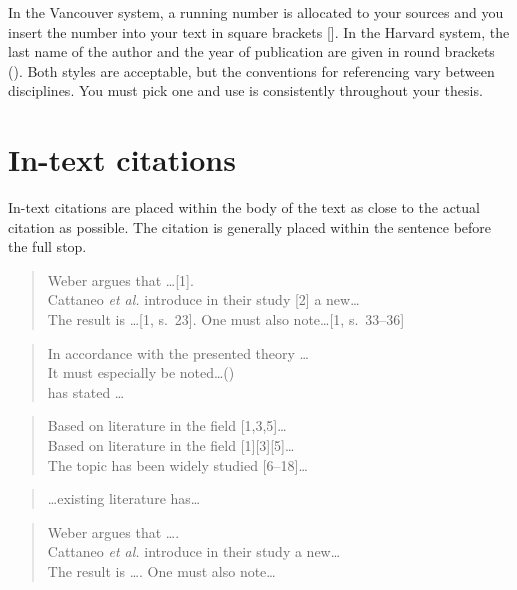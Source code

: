 \documentclass[twoside,draftfooter]{tutthesis} %
\newif\ifnameyear
\begin{document}
In the Vancouver system, a running number is allocated to your sources and you insert the number into your text in square brackets [].
In the Harvard system, the last name of the author and the year of publication are given in round brackets ().
Both styles are acceptable, but the conventions for referencing vary between disciplines.
You must pick one and use is consistently throughout your thesis.


\section{In-text citations}

In-text citations are placed within the body of the text as close to the actual citation as possible.
The citation is generally placed within the sentence before the full stop.

\ifnameyear
  \begin{quotation}
  Weber argues that \ldots [1].\\
  Cattaneo \emph{et al.} introduce in their study [2] a new\ldots\\
  The result is \ldots [1, s.~23]. One must also note\ldots [1, s.~33--36]
  \end{quotation}

  \begin{quotation}
  In accordance with the presented theory \ldots \citep{Weber2001}\\
  It must especially be noted\ldots (\citeauthor{Cattaneo2004})\\
  \citet[s.~230]{Weber2001} has stated \ldots
  \end{quotation}
    
  \begin{quotation}
  Based on literature in the field [1,3,5]\ldots\\
  Based on literature in the field [1][3][5]\ldots\\
  The topic has been widely studied [6--18]\ldots
  \end{quotation}
    
  \begin{quotation}
  \ldots existing literature \citep{Weber2001,Kaunisto2003,Cattaneo2004} has\ldots
  \end{quotation}
\else
  \begin{quotation}
  Weber argues that \ldots \cite{Weber2001}.\\
  Cattaneo \emph{et al.} introduce in their study \cite{Cattaneo2004} a new\ldots\\
  The result is \ldots \cite[s.~23]{Weber2001}. One must also note\ldots \cite[s.~33--36]{Weber2001}
  \end{quotation}
\end{document}
